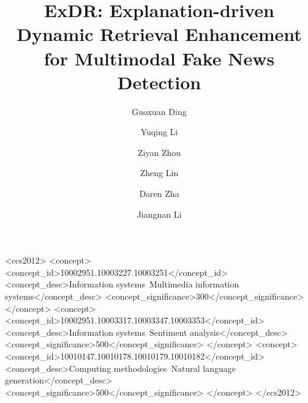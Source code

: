 \documentclass[sigconf]{acmart}
\begin{document}
\title{ExDR: Explanation-driven Dynamic Retrieval Enhancement for Multimodal Fake News Detection}

\author{Guoxuan Ding}

\author{Yuqing Li}
\authornotemark[1]

\author{Ziyan Zhou}

\author{Zheng Lin}

\author{Daren Zha}

\author{Jiangnan Li}


\renewcommand{\shortauthors}{Li et al.}

\begin{abstract}

\end{abstract}

\begin{CCSXML}
<ccs2012>
   <concept>
       <concept_id>10002951.10003227.10003251</concept_id>
       <concept_desc>Information systems~Multimedia information systems</concept_desc>
       <concept_significance>300</concept_significance>
       </concept>
   <concept>
       <concept_id>10002951.10003317.10003347.10003353</concept_id>
       <concept_desc>Information systems~Sentiment analysis</concept_desc>
       <concept_significance>500</concept_significance>
       </concept>
   <concept>
       <concept_id>10010147.10010178.10010179.10010182</concept_id>
       <concept_desc>Computing methodologies~Natural language generation</concept_desc>
       <concept_significance>500</concept_significance>
       </concept>
 </ccs2012>
\end{CCSXML}
\end{document}
